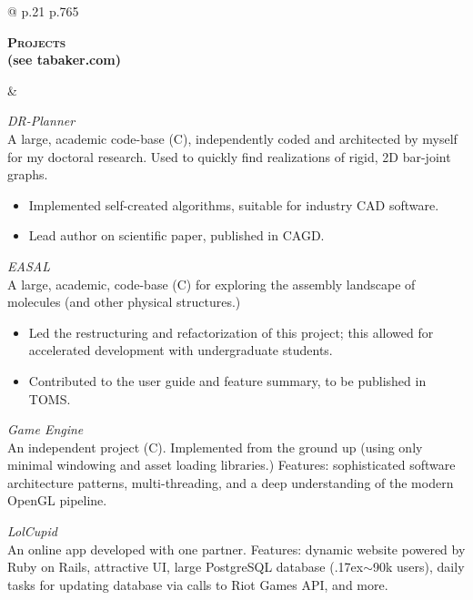 \documentclass[10pt]{article}
\def\mytilde{{\raise.17ex\hbox{$\scriptstyle\mathtt{\sim}$}}}
\def\cpp{{C\nolinebreak[4]\hspace{-.05em}\raisebox{.4ex}{\tiny\bf ++}}}
\newcommand{\titlecell}[1]{%
    \begin{minipage}[t]{\linewidth}
        \raggedleft \bf
        #1
    \end{minipage}}
\newcommand{\contentcell}[1]{%
    \begin{minipage}[t]{\linewidth}
        #1
    \end{minipage}}
\newcommand{\tablerowskip}{\smallskip\smallskip}
\begin{document}
\begin{tabular}{@{} p{.21\textwidth} p{.765\textwidth}}
    \titlecell{\textsc{Projects} \\ (see tabaker.com)} &
    \contentcell{
        {\sl DR-Planner} \\
        A large, academic code-base (\cpp), independently coded and architected by myself for my doctoral research. Used to quickly find realizations of rigid, 2D bar-joint graphs.
        \begin{itemize}[itemsep=0pt,topsep=0pt] \itemsep -2pt
            \item Implemented self-created algorithms, suitable for industry CAD software.
            \item Lead author on scientific paper, published in CAGD.
        \end{itemize}

        \smallskip\smallskip

        {\sl EASAL} \\
        A large, academic, code-base (\cpp) for exploring the assembly landscape of molecules (and other physical structures.)
        \begin{itemize}[itemsep=0pt,topsep=0pt] \itemsep -2pt
            \item Led the restructuring and refactorization of this project; this allowed for accelerated development with undergraduate students.
            \item Contributed to the user guide and feature summary, to be published in TOMS.
        \end{itemize}

        \smallskip\smallskip

        {\sl Game Engine} \\
        An independent project (\cpp). Implemented from the ground up (using only minimal windowing and asset loading libraries.) Features: sophisticated software architecture patterns, multi-threading, and a deep understanding of the modern OpenGL
        pipeline.

        \smallskip\smallskip

        {\sl LolCupid} \\
        An online app developed with one partner. Features: dynamic website powered by Ruby on Rails, attractive UI, large PostgreSQL database (\mytilde 90k users), daily tasks for updating database via calls to Riot Games API, and more.
    }
    \tablerowskip
    \\


\end{tabular}
\end{document}
